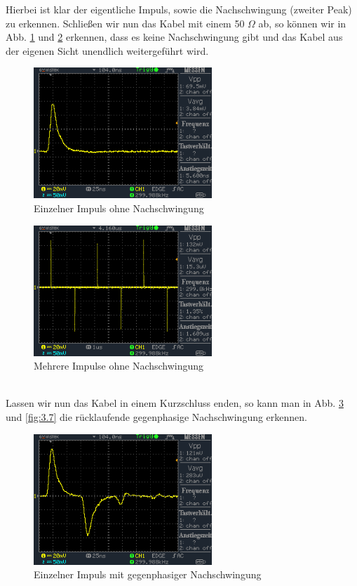 \documentclass[a4paper,10pt]{article}
\numberwithin{equation}{section}
\begin{document}
Hierbei ist klar der eigentliche Impuls, sowie die Nachschwingung (zweiter Peak) zu erkennen.
\indent Schließen wir nun das Kabel mit einem 50 $\Omega$ ab, so können wir in Abb. \ref{fig:3.4} und \ref{fig:3.5} erkennen, dass es keine Nachschwingung gibt und das Kabel aus der eigenen Sicht unendlich weitergeführt wird. 
\begin{figure}[h]
        \centering
        \includegraphics[width=0.6\textwidth]{data/DS0019.BMP.png}
        \caption{Einzelner Impuls ohne Nachschwingung}
		\label{fig:3.4}
\end{figure}
\begin{figure}[h]
        \centering
        \includegraphics[width=0.6\textwidth]{data/DS0020.BMP.png}
        \caption{Mehrere Impulse ohne Nachschwingung}
		\label{fig:3.5}
\end{figure}\\
\indent Lassen wir nun das Kabel in einem Kurzschluss enden, so kann man in Abb. \ref{fig:3.6} und \ref{fig:3.7} die rücklaufende gegenphasige Nachschwingung erkennen.
\begin{figure}[h]
        \centering
        \includegraphics[width=0.6\textwidth]{data/DS0023.BMP.png}
        \caption{Einzelner Impuls mit gegenphasiger Nachschwingung}
		\label{fig:3.6}
\end{figure}
\end{document}

